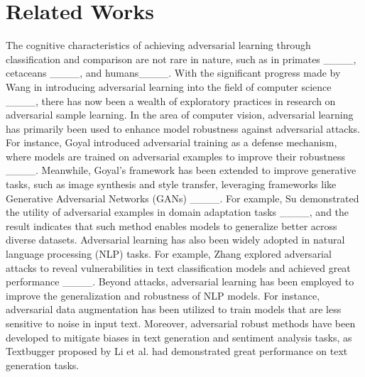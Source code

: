 \section{Related Works}
The cognitive characteristics of achieving adversarial learning through classification and comparison are not rare in nature, such as in primates ____, cetaceans ____, and humans____. With the significant progress made by Wang in introducing adversarial learning into the field of computer science ____, there has now been a wealth of exploratory practices in research on adversarial sample learning. In the area of computer vision, adversarial learning has primarily been used to enhance model robustness against adversarial attacks. For instance, Goyal introduced adversarial training as a defense mechanism, where models are trained on adversarial examples to improve their robustness ____. Meanwhile, Goyal’s framework has been extended to improve generative tasks, such as image synthesis and style transfer, leveraging frameworks like Generative Adversarial Networks (GANs) ____. For example, Su demonstrated the utility of adversarial examples in domain adaptation tasks ____, and the result indicates that such method enables models to generalize better across diverse datasets. Adversarial learning has also been widely adopted in natural language processing (NLP) tasks. For example, Zhang explored adversarial attacks to reveal vulnerabilities in text classification models and achieved great performance ____. Beyond attacks, adversarial learning has been employed to improve the generalization and robustness of NLP models. For instance, adversarial data augmentation has been utilized to train models that are less sensitive to noise in input text. Moreover, adversarial robust methods have been developed to mitigate biases in text generation and sentiment analysis tasks, as Textbugger proposed by Li et al. had demonstrated great performance on text generation tasks.

